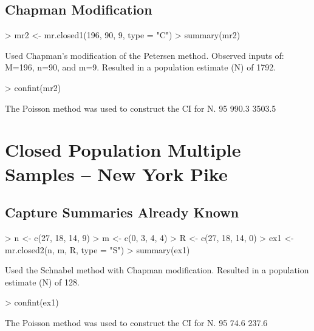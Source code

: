 \documentclass[a4paper]{article}
\begin{document}
\subsection{Chapman Modification}
\begin{Schunk}
\begin{Sinput}
> mr2 <- mr.closed1(196, 90, 9, type = "C")
> summary(mr2)
\end{Sinput}
\begin{Soutput}
Used Chapman's modification of the Petersen method.
Observed inputs of: M=196, n=90, and m=9.
Resulted in a population estimate (N) of 1792.
\end{Soutput}
\begin{Sinput}
> confint(mr2)
\end{Sinput}
\begin{Soutput}
The Poisson method was used to construct the CI for N.
 95% LCI 95% UCI
   990.3  3503.5
\end{Soutput}
\end{Schunk}

\section{Closed Population Multiple Samples -- New York Pike}
\subsection{Capture Summaries Already Known}
\begin{Schunk}
\begin{Sinput}
> n <- c(27, 18, 14, 9)
> m <- c(0, 3, 4, 4)
> R <- c(27, 18, 14, 0)
> ex1 <- mr.closed2(n, m, R, type = "S")
> summary(ex1)
\end{Sinput}
\begin{Soutput}
Used the Schnabel method with Chapman modification.
Resulted in a population estimate (N) of 128.
\end{Soutput}
\begin{Sinput}
> confint(ex1)
\end{Sinput}
\begin{Soutput}
The Poisson method was used to construct the CI for N.
 95% LCI 95% UCI
    74.6   237.6
\end{Soutput}
\end{Schunk}
\end{document}
